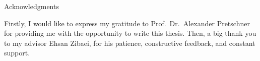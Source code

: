 \thispagestyle{empty}

\vspace*{20mm}

\begin{center}
{ Acknowledgments}
\end{center}

\vspace{10mm}

Firstly, I would like to express my gratitude to Prof.\ Dr.\ Alexander Pretschner for providing me with the opportunity to write this thesis.
Then, a big thank you to my advisor Ehsan Zibaei, for his patience, constructive feedback, and constant support.

\cleardoublepage{}
